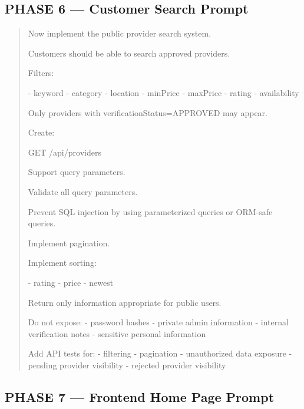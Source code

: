 \subsection*{PHASE 6 --- Customer Search Prompt}

\begin{quote}
Now implement the public provider search system.

Customers should be able to search approved providers.

Filters:

- keyword
- category
- location
- minPrice
- maxPrice
- rating
- availability

Only providers with verificationStatus=APPROVED may appear.

Create:

GET /api/providers

Support query parameters.

Validate all query parameters.

Prevent SQL injection by using parameterized queries or ORM-safe queries.

Implement pagination.

Implement sorting:

- rating
- price
- newest

Return only information appropriate for public users.

Do not expose:
- password hashes
- private admin information
- internal verification notes
- sensitive personal information

Add API tests for:
- filtering
- pagination
- unauthorized data exposure
- pending provider visibility
- rejected provider visibility
\end{quote}

\subsection*{PHASE 7 --- Frontend Home Page Prompt}

